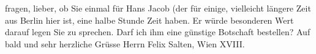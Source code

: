 \begin{ledgroupsized}[t]{13cm}
               fragen, lieber, ob Sie einmal für Hans Jacob
               (der für einige, vielleicht längere Zeit aus Berlin hier ist, eine halbe Stunde Zeit haben. Er würde besonderen Wert
               darauf legen Sie zu sprechen. Darf ich ihm eine günstige Botschaft bestellen? \pend
           \pstart Auf bald und sehr herzliche Grüsse\pend{}{\bigskip}\pstart
           \noindent{}Herrn Felix Salten,\pend
           \pstart
           Wien XVIII.\pend
           
         
         \endnumbering{}\end{ledgroupsized}\begin{anhang}\end{anhang}\newcommand{\dateiname}{L02948}\newcommand{\titel}{Arthur Schnitzler an Felix Salten, 10. 12. 1923}\newcommand{\editorInnen}{Martin Anton Müller und Laura Untner}
      